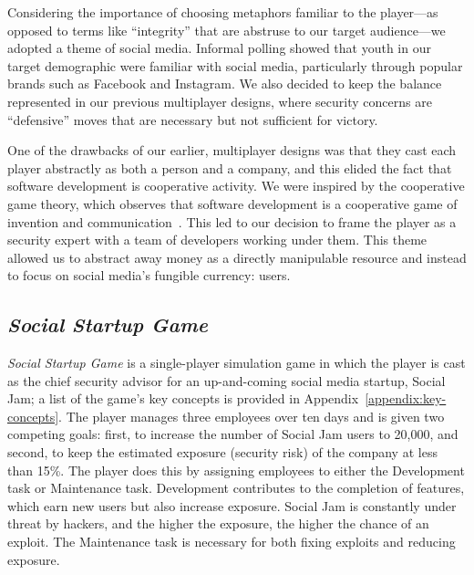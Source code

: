 \documentclass[letterpaper]{article}
\begin{document}
Considering the importance of choosing metaphors familiar to the player---as
opposed to terms like ``integrity'' that are abstruse to our target
audience---we adopted a theme of social media.
Informal polling showed that youth in our target demographic 
were familiar with social media, particularly through popular brands
such as Facebook and Instagram. 
We also decided to keep the balance represented in our previous
multiplayer designs, where security concerns are ``defensive'' moves
that are necessary but not sufficient for victory.

One of the drawbacks of our earlier, multiplayer designs was that they
cast each player abstractly as both a person and a company, and this
elided the fact that software development is cooperative activity.
We were inspired by the cooperative game theory, which observes
that software development is a cooperative game of invention
and communication~\citep{Cockburn2006}.
This led to our decision to frame the player as a security expert
with a team of developers working under them.
This theme allowed us to abstract away money as a directly manipulable
resource and instead to focus on social media's fungible currency: users.

\subsection{\textit{Social Startup Game}}

\textit{Social Startup Game} is a single-player simulation game
in which the player is cast as the chief security advisor for
an up-and-coming social media startup, Social 
Jam;
a list of the game's key concepts is provided in
Appendix~\ref{appendix:key-concepts}.
The player manages three employees over ten days and is given two 
competing goals: first, to increase the number of Social Jam users
to 20,000, and second, to keep the estimated exposure (security risk)
of the company at less than 15\%.
The player does this by assigning employees to either the Development
task or Maintenance task. Development contributes to the completion of
features, which earn new users but also increase exposure.
Social Jam is constantly under threat by hackers, and the higher the
exposure, the higher the chance of an exploit. The Maintenance task
is necessary for both fixing exploits and reducing exposure.
\end{document}
